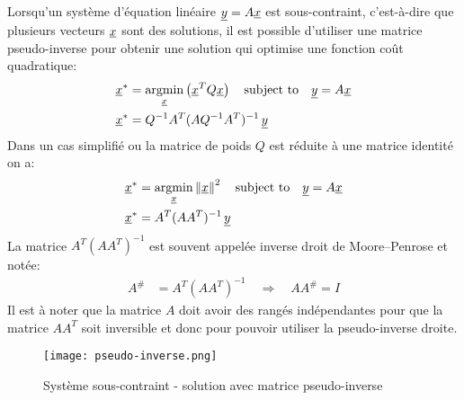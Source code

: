 Lorsqu'un système d'équation linéaire $\underline{y} = A \underline{x}$ est sous-contraint, c'est-à-dire que plusieurs vecteurs $\underline{x}$ sont des solutions, il est possible d'utiliser une matrice pseudo-inverse pour obtenir une solution qui optimise une fonction coût quadratique:
\begin{align}
\col{x}^* &= \operatornamewithlimits{argmin}\limits_{\col{x}} \left( \col{x}^T Q \col{x} \right) \quad \text{subject to} \quad \col{y} = A \col{x}  \\
\col{x}^* &= Q^{-1} A^T (A Q^{-1} A^T)^{-1} \, \col{y}
\end{align}
Dans un cas simplifié ou la matrice de poids $Q$ est réduite à une matrice identité on a:
\begin{align}
\col{x}^* &= \operatornamewithlimits{argmin}\limits_{\col{x}} \left\| \col{x} \right\|^2 \quad \text{subject to} \quad \col{y} = A \col{x}  \\
\col{x}^* &= A^T (A A^T)^{-1} \, \col{y}
\end{align}
La matrice $A^T (A A^T)^{-1}$ est souvent appelée inverse droit de Moore–Penrose et notée:
\begin{align}
A^{\#} &= A^T (A A^T)^{-1}  \quad \Rightarrow \quad A A^{\#} = I
\end{align}
Il est à noter que la matrice $A$ doit avoir des rangés indépendantes pour que la matrice $A A^T$ soit inversible et donc pour pouvoir utiliser la pseudo-inverse droite.

\begin{figure}[htbp]
	\centering
		\texttt{[image: pseudo-inverse.png]}
	\caption{Système sous-contraint - solution avec matrice pseudo-inverse}
	\label{fig:pseudo-inverse}
\end{figure}




